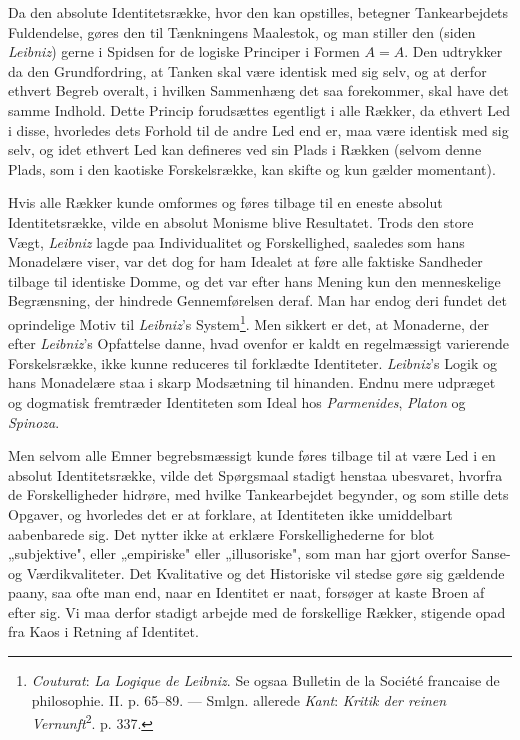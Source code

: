 \documentclass[12pt,a4paper]{book}
\newcommand{\apage}[1]{\marginnote{\footnotesize\textit{[#1]}}}
\begin{document}
Da den absolute Identitetsrække, hvor den kan opstilles, betegner
Tankearbejdets Fuldendelse, gøres den til Tænkningens Maalestok, og man
stiller den (siden \emph{Leibniz}) gerne i Spidsen for de logiske
Principer i Formen $A = A$. Den udtrykker da den Grundfordring, at
Tanken skal være identisk med sig selv, og at derfor ethvert Begreb
overalt, i hvilken Sammenhæng det saa forekommer, skal have det samme
Indhold. Dette Princip forudsættes egentligt i alle Rækker, da ethvert
Led i disse, hvorledes dets Forhold til de andre Led end er, maa være
identisk med sig selv, og idet ethvert Led kan defineres ved sin Plads
i Rækken (selvom denne Plads, som i den kaotiske Forskelsrække, kan
skifte og kun gælder momentant).

Hvis alle Rækker kunde omformes og føres tilbage til en eneste absolut
Identitetsrække, vilde en absolut Monisme blive Resultatet. Trods den
store Vægt, \emph{Leibniz} lagde paa Individualitet og Forskellighed,
saaledes som hans Monadelære viser, var det dog for ham Idealet at føre
alle faktiske Sandheder tilbage til identiske Domme, og det var efter
hans Mening kun den menneskelige Begrænsning, der hindrede
Gennemførelsen deraf. Man har endog deri fundet det oprindelige Motiv
til \emph{Leibniz}'s System\footnote{\emph{Couturat}: \emph{La Logique
de Leibniz}. Se ogsaa Bulletin de la Société francaise de philosophie.
II. p. 65--89. --- Smlgn. allerede \emph{Kant}: \emph{Kritik der reinen
Vernunft}\textsuperscript{2}. p. 337.}. Men sikkert er det, at
Monaderne, der efter \emph{Leibniz}'s Opfattelse danne, hvad ovenfor er
kaldt en regelmæssigt varierende Forskelsrække, ikke kunne reduceres
til forklædte Identiteter. \emph{Leibniz}'s Logik og hans Monadelære
staa i skarp Modsætning til hinanden. Endnu mere udpræget og dogmatisk
fremtræder Identiteten som Ideal hos \emph{Parmenides}, \emph{Platon}
og \emph{Spinoza}. \apage{172}

Men selvom alle Emner begrebsmæssigt kunde føres tilbage til at være
Led i en absolut Identitetsrække, vilde det Spørgsmaal stadigt henstaa
ubesvaret, hvorfra de Forskelligheder hidrøre, med hvilke
Tankearbejdet begynder, og som stille dets Opgaver, og hvorledes det er
at forklare, at Identiteten ikke umiddelbart aabenbarede sig. Det
nytter ikke at erklære Forskellighederne for blot „subjektive", eller
„empiriske" eller „illusoriske", som man har gjort overfor Sanse- og
Værdikvaliteter. Det Kvalitative og det Historiske vil stedse gøre sig
gældende paany, saa ofte man end, naar en Identitet er naat, forsøger
at kaste Broen af efter sig. Vi maa derfor stadigt arbejde med de
forskellige Rækker, stigende opad fra Kaos i Retning af Identitet.
\end{document}
